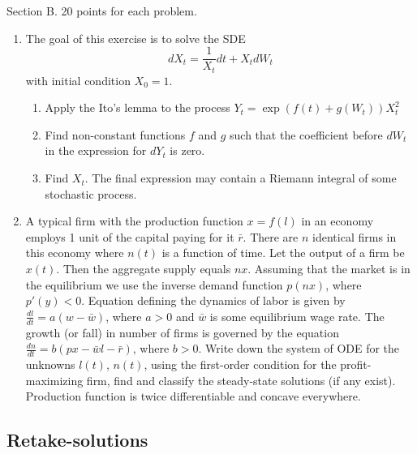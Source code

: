 \documentclass[pdftex,12pt,a4paper]{article}
\begin{document}
Section B. 20 points for each problem. 

\begin{enumerate}[resume]
\item The goal of this exercise is to solve the SDE
\begin{equation}
dX_t=\frac{1}{X_t}dt+X_tdW_t \nonumber
\end{equation}
with initial condition  $X_0=1$.
\begin{enumerate}
\item Apply the Ito's lemma to the process $Y_t=\exp(f(t)+g(W_t))X_t^2$
\item Find non-constant functions $f$ and $g$ such that the coefficient before $dW_t$ in the expression for $dY_t$ is zero.
\item Find $X_t$. The final expression may contain a Riemann integral of some stochastic process.
\end{enumerate}

\item A typical firm with the production function $x=f(l)$ in an economy employs 1 unit of the capital paying for it $\bar{r}$. There are $n$ identical firms in this economy where $n(t)$ is a function of time. Let the output of a firm be $x(t)$. Then the aggregate supply equals $nx$. Assuming that the market is in the equilibrium we use the inverse demand function $p(nx)$, where $p'(y)<0$. Equation defining the dynamics of labor is given by $\frac{dl}{dt}=a(w-\bar{w})$, where $a>0$  and $\bar{w}$  is some equilibrium wage rate. The growth (or fall) in number of firms is governed by the equation $\frac{dn}{dt}=b(px-\bar{w}l-\bar{r})$, where $b>0$. Write down the system of ODE for the unknowns $l(t)$, $n(t)$, using the first-order condition for the profit-maximizing firm, find and classify the steady-state solutions (if any exist). Production function is twice differentiable and concave everywhere.

\end{enumerate}

\subsection{Retake-solutions}
\end{document}
